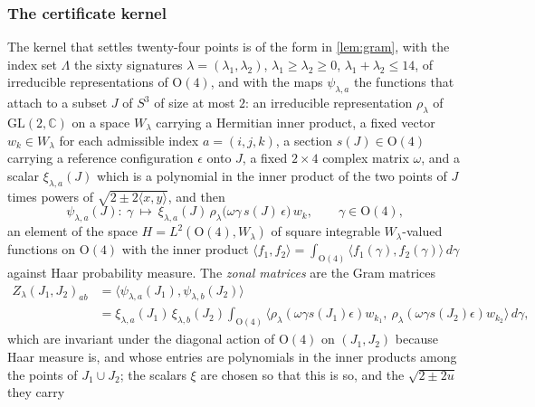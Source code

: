 \documentclass[11pt,reqno]{amsart}
\renewcommand{\_}{\origunderscore\allowbreak}
\numberwithin{equation}{section}
\theoremstyle{plain}
\theoremstyle{definition}
\theoremstyle{remark}
\begin{document}
\subsubsection{The certificate kernel}
\label{sec:certificate-kernel}

The kernel that settles twenty-four points is of the form in
\cref{lem:gram}, with the index set $\Lambda$ the sixty signatures
$\lambda=(\lambda_1,\lambda_2)$, $\lambda_1\ge\lambda_2\ge0$,
$\lambda_1+\lambda_2\le14$, of irreducible representations of
$\mathrm O(4)$, and with the maps $\psi_{\lambda,a}$ the functions that
\cite[\S2--3]{LLM24} attach to a subset $J$ of $S^3$ of size at most
$2$: an irreducible representation $\rho_\lambda$ of
$\mathrm{GL}(2,\mathbb C)$ on a space $W_\lambda$ carrying a Hermitian inner
product, a fixed vector $w_k\in W_\lambda$ for each admissible index
$a=(i,j,k)$, a section $s(J)\in\mathrm O(4)$ carrying a reference
configuration $\epsilon$ onto $J$, a fixed $2\times4$ complex matrix
$\omega$, and a scalar $\xi_{\lambda,a}(J)$ which is a polynomial in the
inner product of the two points of $J$ times powers of
$\sqrt{2\pm2\langle x,y\rangle}$, and then
\begin{equation}\label{eq:psi}
  \psi_{\lambda,a}(J)\colon\ \gamma\ \longmapsto\ \xi_{\lambda,a}(J)\,
  \rho_\lambda\bigl(\omega\gamma\,s(J)\,\epsilon\bigr)\,w_k ,
  \qquad \gamma\in\mathrm O(4),
\end{equation}
an element of the space $H=L^2(\mathrm O(4),W_\lambda)$ of square
integrable $W_\lambda$-valued functions on $\mathrm O(4)$ with the inner
product $\langle f_1,f_2\rangle=\int_{\mathrm O(4)}\langle f_1(\gamma),f_2(\gamma)\rangle\,d\gamma$
against Haar probability measure. The \emph{zonal matrices} are the Gram
matrices
\begin{equation}\label{eq:zonal}
\begin{aligned}
  Z_\lambda(J_1,J_2)_{ab}&=\bigl\langle\psi_{\lambda,a}(J_1),\psi_{\lambda,b}(J_2)\bigr\rangle\\
  &=\xi_{\lambda,a}(J_1)\,\xi_{\lambda,b}(J_2)\int_{\mathrm O(4)}
  \bigl\langle\rho_\lambda(\omega\gamma s(J_1)\epsilon)w_{k_1},\ \rho_\lambda(\omega\gamma s(J_2)\epsilon)w_{k_2}\bigr\rangle\,d\gamma ,
\end{aligned}
\end{equation}
which are invariant under the diagonal action of $\mathrm O(4)$ on
$(J_1,J_2)$ because Haar measure is, and whose entries are polynomials in
the inner products among the points of $J_1\cup J_2$; the scalars
$\xi$ are chosen so that this is so, and the $\sqrt{2\pm2u}$ they carry
\end{document}
